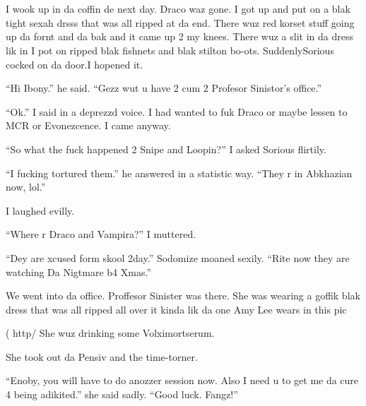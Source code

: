 \section{}



I wook up in da coffin de next day. Draco waz gone. I got up and put on a blak tight sexah drsss that was all ripped at da end. There wuz red korset stuff going up da fornt and da bak and it came up 2 my knees. There wuz a slit in da dress lik in  I pot on ripped blak fishnets and blak stilton bo-ots. Suddenly\dotfill Sorious cocked on da door.\newline I hopened it.

\enquote{Hi Ibony.} he said. \enquote{Gezz wut u have 2 cum 2 Profesor Sinistor's office.}

\enquote{Ok.} I said in a deprezzd voice. I had wanted to fuk Draco or maybe lessen to MCR or Evonezcence. I came anyway.

\enquote{So what the fuck happened 2 Snipe and Loopin?} I asked Sorious flirtily.

\begin{sloppypar}
    \enquote{I fucking tortured them.} he answered in a statistic way. \enquote{They r in Abkhazian now, lol.}
\end{sloppypar}

I laughed evilly.

\enquote{Where r Draco and Vampira?} I muttered.

\enquote{Dey are xcused form skool 2day.} Sodomize moaned sexily. \enquote{Rite now they are watching Da Nigtmare b4 Xmas.}

We went into da office. Proffesor Sinister was there. She was wearing a goffik blak dress that was all ripped all over it kinda lik da one Amy Lee wears in this pic

( http/ She wuz drinking some Volximortserum.

She took out da Pensiv and the time-torner.

\enquote{Enoby, you will have to do anozzer session now. Also I need u to get me da cure 4 being adikited.} she said sadly. \enquote{Good luck. Fangz!}

